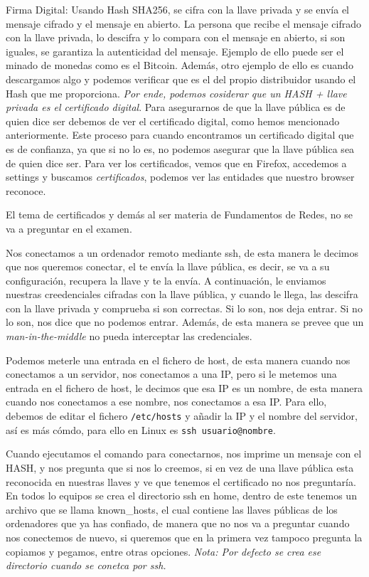 Firma Digital: Usando Hash SHA256, se cifra con la llave privada y se envía el mensaje cifrado y el mensaje en abierto. La persona que recibe el mensaje cifrado con la llave privada, lo descifra y lo compara con el mensaje en abierto, si son iguales, se garantiza la autenticidad del mensaje. Ejemplo de ello puede ser el minado de monedas como es el Bitcoin. Además, otro ejemplo de ello es cuando descargamos algo y podemos verificar que es el del propio distribuidor usando el Hash que me proporciona. \textit{Por ende, podemos cosiderar que un HASH + llave privada es el certificado digital}. Para asegurarnos de que la llave pública es de quien dice ser debemos de ver el certificado digital, como hemos mencionado anteriormente. Este proceso para cuando encontramos un certificado digital que es de confianza, ya que si no lo es, no podemos asegurar que la llave pública sea de quien dice ser. Para ver los certificados, vemos que en Firefox, accedemos a settings y buscamos \textit{certificados}, podemos ver las entidades que nuestro browser reconoce.

\begin{tcolorbox}[colback=yellow!10!white, colframe=red!75!black, title=Advertencia]
El tema de certificados y demás al ser materia de Fundamentos de Redes, no se va a preguntar en el examen.
\end{tcolorbox}

Nos conectamos a un ordenador remoto mediante ssh, de esta manera le decimos que nos queremos conectar, el te envía la llave pública, es decir, se va a su configuración, recupera la llave y te la envía. A continuación, le enviamos nuestras creedenciales cifradas con la llave pública, y cuando le llega, las descifra con la llave privada y comprueba si son correctas. Si lo son, nos deja entrar. Si no lo son, nos dice que no podemos entrar. Además, de esta manera se prevee que un \textit{man-in-the-middle} no pueda interceptar las credenciales.

Podemos meterle una entrada en el fichero de host, de esta manera cuando nos conectamos a un servidor, nos conectamos a una IP, pero si le metemos una entrada en el fichero de host, le decimos que esa IP es un nombre, de esta manera cuando nos conectamos a ese nombre, nos conectamos a esa IP. Para ello, debemos de editar el fichero \texttt{/etc/hosts} y añadir la IP y el nombre del servidor, así es más cómdo, para ello en Linux es \texttt{ssh usuario@nombre}. 

Cuando ejecutamos el comando para conectarnos, nos imprime un mensaje con el HASH, y nos pregunta que si nos lo creemos, si en vez de una llave pública esta reconocida en nuestras llaves y ve que tenemos el certificado no nos preguntaría. En todos lo equipos se crea el directorio ssh en home, dentro de este tenemos un archivo que se llama known\_hosts, el cual contiene las llaves públicas de los ordenadores que ya has confiado, de manera que no nos va a preguntar cuando nos conectemos de nuevo, si queremos que en la primera vez tampoco pregunta la copiamos y pegamos, entre otras opciones. \textit{Nota: Por defecto se crea ese directorio cuando se conetca por ssh.}

